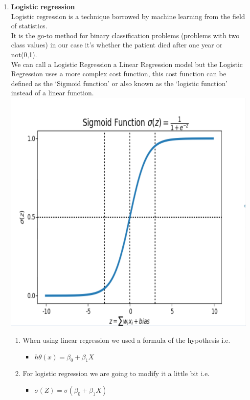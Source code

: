 \documentclass[a4paper, 11pt, oneside]{article} %
\begin{document}
\begin {enumerate}
Advantages of Naive Bayes:
\begin{enumerate}
\item When assumption of independent predictors holds true, a Naive Bayes classifier performs better as compared to other models.

\item Naive Bayes requires a small amount of training data to estimate the test data. So, the training period is less.

\item Naive Bayes is also easy to implement.
\end{enumerate}
\newpage



\item  \textbf { Logistic regression }   \\
Logistic regression is a technique borrowed by machine learning from the field of statistics.\\
It is the go-to method for binary classification problems (problems with two class values) in our case it’s whether the patient died after one year or not(0,1).\\
We can call a Logistic Regression a Linear Regression model but the Logistic Regression uses a more complex cost function, this cost function can be defined as the ‘Sigmoid function’ or also known as the ‘logistic function’ instead of a linear function.\cite{machinelearningmastery} \\


\includegraphics[width=13cm, height=8 cm]{figures/Sigmoid}



\begin{enumerate}
\item When using linear regression we used a formula of the hypothesis i.e.
\begin{itemize}
\item $h{\theta(x)} = \beta_ {0}  + \beta_{1} X$
\end{itemize}
\item For logistic regression we are going to modify it a little bit i.e.
\begin {itemize}
\item $\sigma(Z) = \sigma(\beta_{0} +\beta_{1}X)$
\end{itemize}


\end{enumerate}
\end{enumerate}
\end{document}
